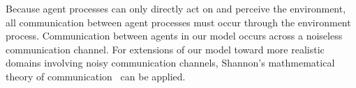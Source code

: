 Because agent processes can only directly act on and perceive the
environment, all communication between agent processes must occur
through the environment process.  Communication between agents in our
model occurs across a noiseless communication channel.  For extensions
of our model toward more realistic domains involving noisy
communication channels, Shannon's mathmematical theory of
communication~\citep{shannon:1959} can be applied.



